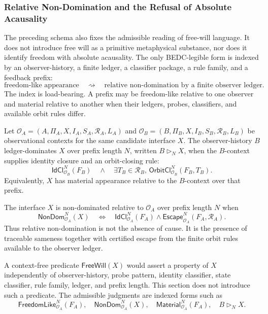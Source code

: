 \subsubsection{Relative Non-Domination and the Refusal of Absolute Acausality}
\label{subsubsec:philosophy-relative-non-domination}

The preceding schema also fixes the admissible reading of free-will
language. It does not introduce free will as a primitive metaphysical
substance, nor does it identify freedom with absolute acausality. The
only BEDC-legible form is indexed by an observer-history, a finite
ledger, a classifier package, a rule family, and a feedback prefix:
$$
\text{freedom-like appearance}
\quad\rightsquigarrow\quad
\text{relative non-domination by a finite observer ledger}.
$$
The index is load-bearing. A prefix may be freedom-like relative to one
observer and material relative to another when their ledgers, probes,
classifiers, and available orbit rules differ.

\begin{definition}
\label{def:philosophy-ledger-dominance}
Let $\mathcal O_A=(A,\Pi_A,X,I_A,S_A,\mathcal R_A,L_A)$ and
$\mathcal O_B=(B,\Pi_B,X,I_B,S_B,\mathcal R_B,L_B)$ be observational
contexts for the same candidate interface $X$. The observer-history
$B$ ledger-dominates $X$ over prefix length $N$, written
$B\triangleright_N X$, when the $B$-context supplies identity closure
and an orbit-closing rule:
$$
\mathsf{IdCl}^N_{\mathcal O_B}(F_B)
\quad\wedge\quad
\exists T_B\in\mathcal R_B,\,
\mathsf{OrbitCl}^N_{\mathcal O_B}(F_B,T_B).
$$
Equivalently, $X$ has material appearance relative to the
$B$-context over that prefix.
\end{definition}

\begin{definition}
\label{def:philosophy-relative-non-domination}
The interface $X$ is non-dominated relative to $\mathcal O_A$ over
prefix length $N$ when
$$
\mathsf{NonDom}^N_{\mathcal O_A}(X)
\quad\Longleftrightarrow\quad
\mathsf{IdCl}^N_{\mathcal O_A}(F_A)
\wedge
\mathsf{Escape}^N_{\mathcal O_A}(F_A,\mathcal R_A).
$$
Thus relative non-domination is not the absence of cause. It is the
presence of traceable sameness together with certified escape from the
finite orbit rules available to the observer ledger.
\end{definition}

\begin{definition}
\label{def:philosophy-forbidden-absolute-freewill}
A context-free predicate $\mathsf{FreeWill}(X)$ would assert a property
of $X$ independently of observer-history, probe pattern, identity
classifier, state classifier, rule family, ledger, and prefix length.
This section does not introduce such a predicate. The admissible
judgments are indexed forms such as
$$
\mathsf{FreedomLike}^N_{\mathcal O_A}(F_A),
\quad
\mathsf{NonDom}^N_{\mathcal O_A}(X),
\quad
\mathsf{Material}^N_{\mathcal O_A}(F_A),
\quad
B\triangleright_N X.
$$
\end{definition}

